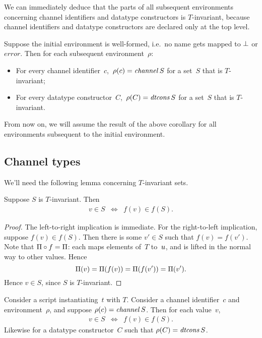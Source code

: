 We can immediately deduce that the parts of all subsequent environments
concerning channel identifiers and datatype constructors is $T$-invariant,
because channel identifiers and datatype constructors are declared only at the
top level.
%
\begin{corollary}
\label{cor:invariant}
Suppose the initial environment is well-formed, i.e.~no name gets mapped to
$\perp$ or $error$.  Then for each subsequent environment~$\rho$:
\begin{itemize}
\item For every channel identifier~$c$,\, $\rho(c) = \mathop{\it channel} S$ for a set~$S$
  that is $T$-invariant;

\item For every datatype constructor~$C$,\, $\rho(C) = \mathop{\it dtcons} S$ for a
  set~$S$ that is $T$-invariant.
\end{itemize}
\end{corollary}
%
From now on, we will assume the result of the above corollary for all
environments subsequent to the initial environment. 


\subsection{Channel types}

We'll need the following lemma concerning $T$-invariant sets.
%
\begin{lemma}
\label{lem:T-invariant-inclusion}
Suppose $S$ is $T$-invariant.  Then 
%
\begin{eqnarray*}
v \in S & \iff & f(v) \in f(S).
\end{eqnarray*}
\end{lemma}


\begin{proof}
The left-to-right implication is immediate.  For the right-to-left
implication, suppose $f(v) \in f(S)$.  Then there is some $v' \in S$ such that
$f(v) = f(v')$.  Note that $\Pi \circ f = \Pi$: each maps elements
of~$T$ to~$u$, and is lifted in the normal way to other values.  Hence
\[
\Pi(v) = \Pi(f(v)) = \Pi(f(v')) = \Pi(v').
\]
Hence $v \in S$, since $S$ is $T$-invariant.
\end{proof}


\begin{corollary}
\label{cor:channel-types}
Consider a script instantiating~$t$ with $T$.  Consider a channel
identifier~$c$ and environment~$\rho$, and suppose $\rho(c) = \mathop{\it channel} S$.
Then for each value~$v$,
\begin{eqnarray*}
v \in S & \iff & f(v) \in f(S).
\end{eqnarray*}
%
Likewise for a datatype constructor~$C$ such that $\rho(C) = \mathop{\it dtcons} S$. 
\end{corollary}

